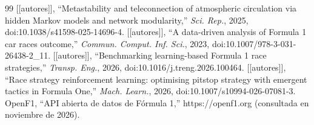 \documentclass[11pt,letterpaper]{article}
\newcommand{\pend}[1]{\textcolor{red!70!black}{[#1]}}
\begin{document}
\begin{thebibliography}{99}
 \pend{[autores]}, ``Metastability and teleconnection of atmospheric circulation via hidden Markov models and network modularity,'' \emph{Sci. Rep.}, 2025, doi:10.1038/s41598-025-14696-4.
 \pend{[autores]}, ``A data-driven analysis of Formula 1 car races outcome,'' \emph{Commun. Comput. Inf. Sci.}, 2023, doi:10.1007/978-3-031-26438-2\_11.
 \pend{[autores]}, ``Benchmarking learning-based Formula 1 race strategies,'' \emph{Transp. Eng.}, 2026, doi:10.1016/j.treng.2026.100464.
 \pend{[autores]}, ``Race strategy reinforcement learning: optimising pitstop strategy with emergent tactics in Formula One,'' \emph{Mach. Learn.}, 2026, doi:10.1007/s10994-026-07081-3.
 OpenF1, ``API abierta de datos de Fórmula 1,'' https://openf1.org (consultada en noviembre de 2026).
\end{thebibliography}
\end{document}
